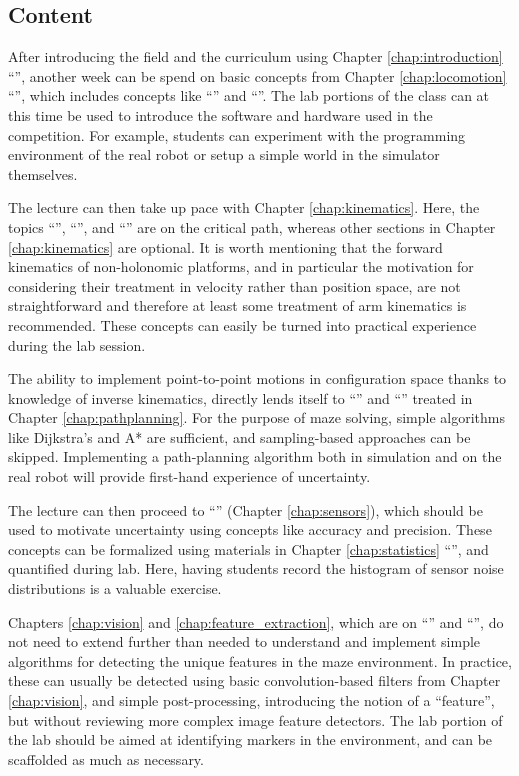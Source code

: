 \documentclass[paper=6.14in:9.21in,pagesize=pdftex,11pt,twoside,openright]{scrbook}
\begin{document}
\subsection{Content}\label{sec:curr1content}
After introducing the field and the curriculum using Chapter \ref{chap:introduction} ``'', another week can be spend on basic concepts from Chapter \ref{chap:locomotion} ``'', which includes concepts like ``'' and ``''. The lab portions of the class can at this time be used to introduce the software and hardware used in the competition. For example, students can experiment with the programming environment of the real robot or setup a simple world in the simulator themselves.

The lecture can then take up pace with Chapter \ref{chap:kinematics}. Here, the topics ``'', ``'', and ``'' are on the critical path, whereas other sections in Chapter \ref{chap:kinematics} are optional. It is worth mentioning that the forward kinematics of non-holonomic platforms, and in particular the motivation for considering their treatment in velocity rather than position space, are not straightforward and therefore at least some treatment of arm kinematics is recommended. These concepts can easily be turned into practical experience during the lab session.

The ability to implement point-to-point motions in configuration space thanks to knowledge of inverse kinematics, directly lends itself to ``'' and ``'' treated in Chapter \ref{chap:pathplanning}. For the purpose of maze solving, simple algorithms like Dijkstra's and A* are sufficient, and sampling-based approaches can be skipped. Implementing a path-planning algorithm both in simulation and on the real robot will provide first-hand experience of uncertainty.

The lecture can then proceed to ``'' (Chapter \ref{chap:sensors}), which should be used to motivate uncertainty using concepts like accuracy and precision. These concepts can be formalized using materials in Chapter \ref{chap:statistics} ``'', and quantified during lab. Here, having students record the histogram of sensor noise distributions is a valuable exercise.

Chapters \ref{chap:vision} and \ref{chap:feature_extraction}, which are on ``'' and ``'', do not need to extend further than needed to understand and implement simple algorithms for detecting the unique features in the maze environment. In practice, these can usually be detected using basic convolution-based filters from Chapter \ref{chap:vision}, and simple post-processing, introducing the notion of a ``feature'', but without reviewing more complex image feature detectors. The lab portion of the lab should be aimed at identifying markers in the environment, and can be scaffolded as much as necessary.
\end{document}
